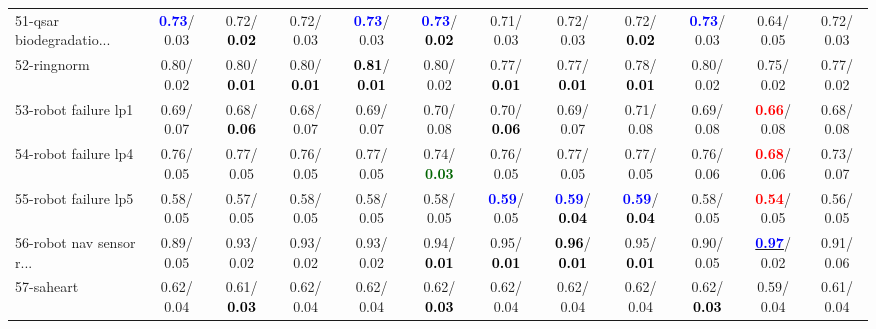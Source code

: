 \begin{table}[h]
\begin{center}
{\begin{tabular}{lc|c|c|c|c|c|c|c|c|c|c}
51-qsar biodegradatio... & \textcolor{blue}{\textbf{  0.73}}/  0.03 &   0.72/\textcolor{black}{\textbf{  0.02}} &   0.72/  0.03 & \textcolor{blue}{\textbf{  0.73}}/  0.03 & \textcolor{blue}{\textbf{  0.73}}/\textcolor{black}{\textbf{  0.02}} &   0.71/  0.03 &   0.72/  0.03 &   0.72/\textcolor{black}{\textbf{  0.02}} & \textcolor{blue}{\textbf{  0.73}}/  0.03 &   0.64/  0.05 &   0.72/  0.03 \\
52-ringnorm &   0.80/  0.02 &   0.80/\textcolor{black}{\textbf{  0.01}} &   0.80/\textcolor{black}{\textbf{  0.01}} & \textcolor{black}{\textbf{  0.81}}/\textcolor{black}{\textbf{  0.01}} &   0.80/  0.02 &   0.77/\textcolor{black}{\textbf{  0.01}} &   0.77/\textcolor{black}{\textbf{  0.01}} &   0.78/\textcolor{black}{\textbf{  0.01}} &   0.80/  0.02 &   0.75/  0.02 &   0.77/  0.02 \\
53-robot failure lp1 &   0.69/  0.07 &   0.68/\textcolor{black}{\textbf{  0.06}} &   0.68/  0.07 &   0.69/  0.07 &   0.70/  0.08 &   0.70/\textcolor{black}{\textbf{  0.06}} &   0.69/  0.07 &   0.71/  0.08 &   0.69/  0.08 & \textcolor{red}{\textbf{  0.66}}/  0.08 &   0.68/  0.08 \\ \hline
54-robot failure lp4 &   0.76/  0.05 &   0.77/  0.05 &   0.76/  0.05 &   0.77/  0.05 &   0.74/\textcolor{darkgreen}{\textbf{  0.03}} &   0.76/  0.05 &   0.77/  0.05 &   0.77/  0.05 &   0.76/  0.06 & \textcolor{red}{\textbf{  0.68}}/  0.06 &   0.73/  0.07 \\
55-robot failure lp5 &   0.58/  0.05 &   0.57/  0.05 &   0.58/  0.05 &   0.58/  0.05 &   0.58/  0.05 & \textcolor{blue}{\textbf{  0.59}}/  0.05 & \textcolor{blue}{\textbf{  0.59}}/\textcolor{black}{\textbf{  0.04}} & \textcolor{blue}{\textbf{  0.59}}/\textcolor{black}{\textbf{  0.04}} &   0.58/  0.05 & \textcolor{red}{\textbf{  0.54}}/  0.05 &   0.56/  0.05 \\
56-robot nav sensor r... &   0.89/  0.05 &   0.93/  0.02 &   0.93/  0.02 &   0.93/  0.02 &   0.94/\textcolor{black}{\textbf{  0.01}} &   0.95/\textcolor{black}{\textbf{  0.01}} & \textcolor{black}{\textbf{  0.96}}/\textcolor{black}{\textbf{  0.01}} &   0.95/\textcolor{black}{\textbf{  0.01}} &   0.90/  0.05 & \underline{\textcolor{blue}{\textbf{  0.97}}}/  0.02 &   0.91/  0.06 \\
57-saheart &   0.62/  0.04 &   0.61/\textcolor{black}{\textbf{  0.03}} &   0.62/  0.04 &   0.62/  0.04 &   0.62/\textcolor{black}{\textbf{  0.03}} &   0.62/  0.04 &   0.62/  0.04 &   0.62/  0.04 &   0.62/\textcolor{black}{\textbf{  0.03}} &   0.59/  0.04 &   0.61/  0.04 \\

\end{tabular}}
\end{center}
\end{table}
